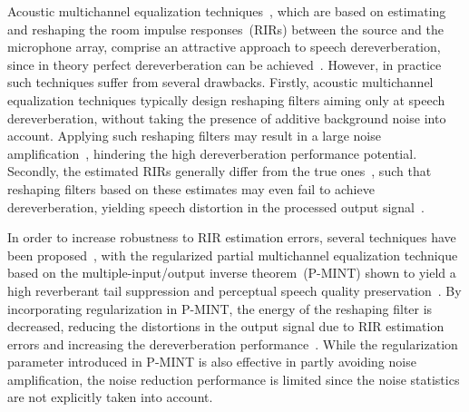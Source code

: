 \documentclass{article}
\begin{document}
Acoustic multichannel equalization techniques~\cite{Kodrasi_ITASLP_2013,Miyoshi_ITASS_1988,Zhang_IWAENC_2010,Mertins_ITASLP_2010}, which are based on estimating and reshaping the room impulse responses~(RIRs) between the source and the microphone array, comprise an attractive approach to speech dereverberation, since in theory perfect dereverberation can be achieved~\cite{Kodrasi_ITASLP_2013,Miyoshi_ITASS_1988}. 
However, in practice such techniques suffer from several drawbacks. 
Firstly, acoustic multichannel equalization techniques typically design reshaping filters aiming only at speech dereverberation, without taking the presence of additive background noise into account.
Applying such reshaping filters may result in a large noise amplification~\cite{Kodrasi_ITASLP_2013}, hindering the high dereverberation performance potential.
Secondly, the estimated RIRs generally differ from the true ones~\cite{Radlovic_ITSA_2000,Hasan_EUSIPCO_2006,Lin_ITASLP_2012}, such that reshaping filters based on these estimates may even fail to achieve dereverberation, yielding speech distortion in the processed output signal~\cite{Kodrasi_ITASLP_2013,Zhang_IWAENC_2010,Lim_EUSIPCO_2013}. 

In order to increase robustness to RIR estimation errors, several techniques have been proposed~\cite{Kodrasi_ITASLP_2013,Zhang_IWAENC_2010,Lim_EUSIPCO_2013,Lim_WASPAA_2013}, with the regularized partial multichannel equalization technique based on the multiple-input/output inverse theorem~(P-MINT) shown to yield a high reverberant tail suppression and perceptual speech quality preservation~\cite{Kodrasi_ITASLP_2013}.
By incorporating regularization in P-MINT, the energy of the reshaping filter is decreased, reducing the distortions in the output signal due to RIR estimation errors and increasing the dereverberation performance~\cite{Kodrasi_ITASLP_2013}.
While the regularization parameter introduced in P-MINT is also effective in partly avoiding noise amplification, the noise reduction performance is limited since the noise statistics are not explicitly taken into account.
\end{document}
